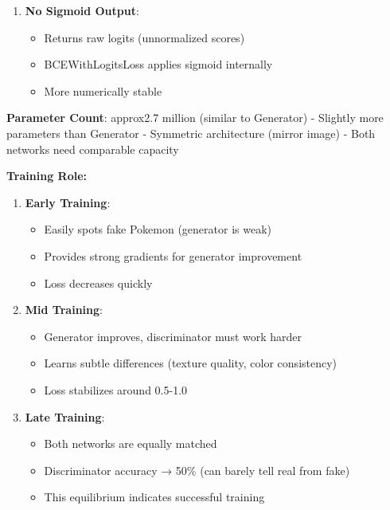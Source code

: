 \documentclass[11pt]{article}
\providecommand{\tightlist}{%
      \setlength{\itemsep}{0pt}\setlength{\parskip}{0pt}}
\begin{document}
\begin{enumerate}
  \begin{itemize}
  \tightlist
  \item
    DCGAN guideline for stability
  \item
    First layer processes raw pixels directly
  \item
    BatchNorm in all subsequent layers
  \end{itemize}
\item
  \textbf{No Sigmoid Output}:

  \begin{itemize}
  \tightlist
  \item
    Returns raw logits (unnormalized scores)
  \item
    BCEWithLogitsLoss applies sigmoid internally
  \item
    More numerically stable
  \end{itemize}
\end{enumerate}

\textbf{Parameter Count}: approx2.7 million (similar to Generator) -
Slightly more parameters than Generator - Symmetric architecture (mirror
image) - Both networks need comparable capacity

\textbf{Training Role:}

\begin{enumerate}
\def\labelenumi{\arabic{enumi}.}
\tightlist
\item
  \textbf{Early Training}:

  \begin{itemize}
  \tightlist
  \item
    Easily spots fake Pokemon (generator is weak)
  \item
    Provides strong gradients for generator improvement
  \item
    Loss decreases quickly
  \end{itemize}
\item
  \textbf{Mid Training}:

  \begin{itemize}
  \tightlist
  \item
    Generator improves, discriminator must work harder
  \item
    Learns subtle differences (texture quality, color consistency)
  \item
    Loss stabilizes around 0.5-1.0
  \end{itemize}
\item
  \textbf{Late Training}:

  \begin{itemize}
  \tightlist
  \item
    Both networks are equally matched
  \item
    Discriminator accuracy → 50\% (can barely tell real from fake)
  \item
    This equilibrium indicates successful training
  \end{itemize}
\end{enumerate}
\end{document}

